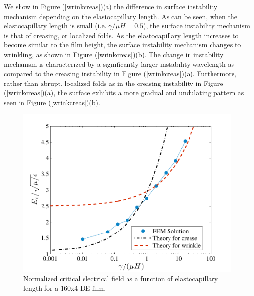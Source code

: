 \documentclass[8.5pt,twoside,twocolumn]{article}
\begin{document}
We show in Figure (\ref{wrinkcreas})(a) the difference in surface instability mechanism depending on the elastocapillary length.  As can be seen, when the elastocapillary length is small (i.e. $\gamma/\mu H=0.5$), the surface instability mechanism is that of creasing, or localized folds.  As the elastocapillary length increases to become similar to the film height, the surface instability mechanism changes to wrinkling, as shown in Figure (\ref{wrinkcreas})(b).  The change in instability mechanism is characterized by a significantly larger instability wavelength as compared to the creasing instability in Figure (\ref{wrinkcreas})(a).  Furthermore, rather than abrupt, localized folds as in the creasing instability in Figure (\ref{wrinkcreas})(a), the surface exhibits a more gradual and undulating pattern as seen in Figure (\ref{wrinkcreas})(b).  

\begin{figure} \centering 
\includegraphics[scale=0.58]{pics/Ec.pdf}
\caption{Normalized critical electrical field as a function of elastocapillary length for a 160x4 DE film.}   
\label{ecrit2} \end{figure}
\end{document}
